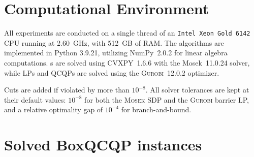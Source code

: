 \documentclass[twoside]{article}
\begin{document}
	
	\section{Computational Environment} 
	\label{A:environment}
	
	All experiments are conducted on a single thread of an \texttt{Intel Xeon Gold 6142} CPU running at 2.60~GHz, with 512~GB of RAM. The algorithms are implemented in Python 3.9.21, utilizing NumPy~2.0.2 \cite{harris2020numpy} for linear algebra computations. \SDPx s are solved using CVXPY~1.6.6 \cite{diamond2016cvxpy} with the Mosek~11.0.24 \cite{mosek} solver, while LPs and QCQPs are solved using the \textsc{Gurobi}~12.0.2 \cite{gurobi} optimizer. 
	
	Cuts are added if violated by more than $10^{-8}$. All solver tolerances are kept at their default values: $10^{-8}$ for both the \textsc{Mosek} SDP and the \textsc{Gurobi} barrier LP, and a relative optimality gap of $10^{-4}$ for branch-and-bound.
	
	\section{Solved BoxQCQP instances}
	\label{app:solvedBoxQCQP}
	
\end{document}
